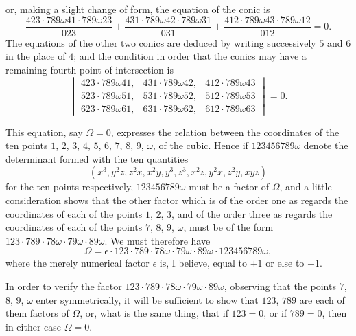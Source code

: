 \documentclass[11pt,a4paper]{article}
\begin{document}
or, making a slight change of form, the equation of the conic is
\[
\frac{423 \cdot 789\omega 41 \cdot 789\omega 23}{023}
+ \frac{431 \cdot 789\omega 42 \cdot 789\omega 31}{031}
+ \frac{412 \cdot 789\omega 43 \cdot 789\omega 12}{012} = 0.
\]
The equations of the other two conics are deduced by writing successively $5$ and $6$ in the place of $4$; and the condition in order that the conics may have a remaining fourth point of intersection is
\[
\begin{vmatrix}
423 \cdot 789\omega 41, & 431 \cdot 789\omega 42, & 412 \cdot 789\omega 43\\
523 \cdot 789\omega 51, & 531 \cdot 789\omega 52, & 512 \cdot 789\omega 53\\
623 \cdot 789\omega 61, & 631 \cdot 789\omega 62, & 612 \cdot 789\omega 63
\end{vmatrix}
= 0.
\]

\newpage
\setcounter{page}{503}

This equation, say $\Omega = 0$, expresses the relation between the coordinates of the ten points $1$, $2$, $3$, $4$, $5$, $6$, $7$, $8$, $9$, $\omega$, of the cubic. Hence if $123456789\omega$ denote the determinant formed with the ten quantities
\[
(x^3, y^2z, z^2x, x^2y, y^3, z^3, x^2z, y^2x, z^2y, xyz)
\]
for the ten points respectively, $123456789\omega$ must be a factor of $\Omega$, and a little consideration shows that the other factor which is of the order one as regards the coordinates of each of the points $1$, $2$, $3$, and of the order three as regards the coordinates of each of the points $7$, $8$, $9$, $\omega$, must be of the form $123 \cdot 789 \cdot 78\omega \cdot 79\omega \cdot 89\omega$. We must therefore have
\[
\Omega = \epsilon \cdot 123 \cdot 789 \cdot 78\omega \cdot 79\omega \cdot 89\omega \cdot 123456789\omega,
\]
where the merely numerical factor $\epsilon$ is, I believe, equal to $+1$ or else to $-1$.

In order to verify the factor $123 \cdot 789 \cdot 78\omega \cdot 79\omega \cdot 89\omega$, observing that the points $7$, $8$, $9$, $\omega$ enter symmetrically, it will be sufficient to show that $123$, $789$ are each of them factors of $\Omega$, or, what is the same thing, that if $123 = 0$, or if $789 = 0$, then in either case $\Omega = 0$.
\end{document}
